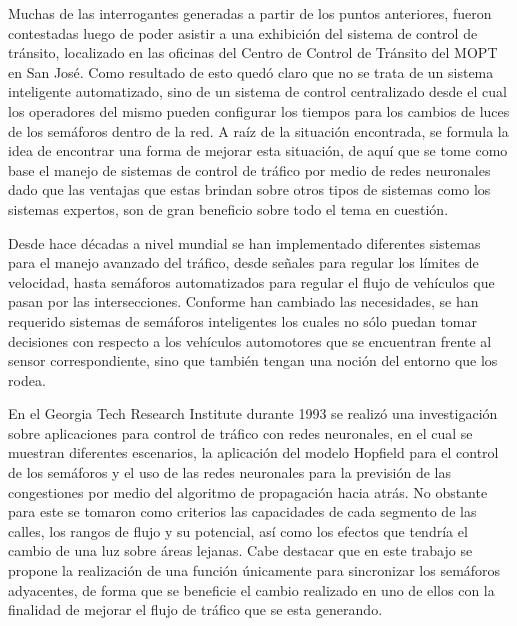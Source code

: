 		Muchas de las interrogantes generadas a partir de los puntos anteriores,
		fueron contestadas luego de poder asistir a una exhibici\'{o}n del sistema de control de tr\'{a}nsito, localizado en las
	oficinas del Centro de Control de Tr\'{a}nsito del MOPT en San Jos\'{e}. Como resultado
	de esto qued\'{o} claro que no se trata de un sistema inteligente automatizado,
	sino de un sistema de control centralizado desde el cual los operadores del
	mismo pueden configurar los tiempos para los cambios de luces de los
	sem\'{a}foros dentro de la red.  A ra\'{i}z de la situaci\'{o}n encontrada, se
	formula la idea de encontrar una forma de mejorar esta situaci\'{o}n, de
	aqu\'{i} que se tome como base el manejo de sistemas de control de tr\'{a}fico por medio de redes neuronales dado que las ventajas que estas brindan sobre otros tipos de sistemas como los sistemas expertos, son de gran beneficio sobre todo el tema en cuesti\'{o}n.
	
		Desde hace d\'{e}cadas a nivel mundial se han implementado diferentes sistemas
	para el manejo avanzado del tr\'{a}fico, desde se\~{n}ales para regular los l\'{i}mites de
	velocidad, hasta sem\'{a}foros automatizados para regular el flujo de veh\'{i}culos que
	pasan por las intersecciones. Conforme han cambiado las necesidades, se han
	requerido sistemas de sem\'{a}foros inteligentes los cuales no s\'{o}lo puedan tomar decisiones con respecto a los veh\'{i}culos automotores que se encuentran frente al sensor correspondiente, sino que tambi\'{e}n tengan una noci\'{o}n del entorno que los rodea.

			En el Georgia Tech Research Institute durante 1993
			se realiz\'{o} una investigaci\'{o}n sobre aplicaciones para control de tr\'{a}fico con redes neuronales,
	en el cual se muestran diferentes escenarios, la aplicaci\'{o}n del modelo
	Hopfield para el control de los sem\'{a}foros y el uso de las redes neuronales
	para la previsi\'{o}n de las congestiones por medio del algoritmo de
	propagaci\'{o}n hacia atr\'{a}s. No obstante para este se tomaron como criterios las capacidades de cada segmento de las calles, los rangos de flujo y su potencial, as\'{i} como los efectos que tendr\'{i}a el cambio de una luz sobre \'{a}reas lejanas. Cabe destacar que en este trabajo se propone la realizaci\'{o}n de una funci\'{o}n \'{u}nicamente para sincronizar los sem\'{a}foros adyacentes, de forma que se beneficie el cambio realizado en uno de ellos con la finalidad de mejorar el flujo de tr\'{a}fico que se esta generando.\cite{Gilmore1993}

